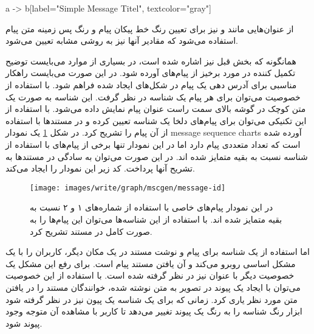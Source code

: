 \begin{MSC}
a -> b[label="Simple Message Titel", textcolor="gray"]
\end{MSC}

از عنوان‌هایی مانند  و  نیز برای تعیین رنگ خط
پیکان پیام و رنگ پس زمینه متن پیام استفاده می‌شود که مقادیر آنها نیز به روشی
مشابه تعیین می‌شود.


همانگونه که بخش قبل نیز اشاره شده است، در بسیاری از موارد می‌بایست توضیح تکمیل
کننده در مورد برخیز از پیام‌های آورده شود. در این صورت می‌بایست راهکار مناسبی
برای آدرس دهی یک پیام در شکل‌های ایجاد شده فراهم شود. با استفاده از خصوصیت
 می‌توان برای هر پیام یک شناسه در نظر گرفت. این شناسه به صورت یک متن کوچک
در گوشه بالای سمت راست عنوان پیام نمایش داده می‌شود. با استفاده از این تکنیکی
می‌توان برای پیام‌های دلخا یک شناسه تعیین کرده و در مستندها با استفاده از آن
پیام را تشریح کرد. در شکل \ref{write/graph/mscgen/message-id}
یک نمودار \glspl{message sequence chart} آورده شده است که تعداد متعددی پیام
دارد اما در این نمودار تنها برخی از پیام‌های با استفاده از شناسه نسبت به بقیه
متمایز شده اند. در این صورت می‌توان به سادگی در مستندها به تشریح آنها پرداخت. 
کد زیر این نمودار را ایجاد می‌کند.


\begin{figure}[h]
\centering
\texttt{[image: images/write/graph/mscgen/message-id]}
\caption[تعیین شناسه برای پیام‌ها]{
	در این نمودار پیام‌های خاصی با استفاده از شماره‌های ۱ و ۲ نسبت به بقیه متمایز
	شده اند. با استفاده از این شناسه‌ها می‌توان این پیام‌ها را به صورت کامل در
	مستند تشریح کرد.
	}
\label{write/graph/mscgen/message-id}
\end{figure}

اما استفاده از یک شناسه برای پیام و نوشت مستند در یک مکان دیگر، کاربران را با یک
مشکل اساسی روبرو می‌کند و آن یافتن مستند پیام است. برای رفع این مشکل یک خصوصیت
دیگر با عنوان  نیز در نظر گرفته شده است. با استفاده از این خصوصیت
می‌توان با ایجاد یک پیوند در تصویر به متن نوشته شده، خوانندگان مستند را در یافتن
متن مورد نظر یاری کرد. زمانی که برای یک شناسه یک پیون نیز در نظر گرفته شود ابزار
 رنگ شناسه را به رنگ یک پیوند تغییر می‌دهد تا کاربر با مشاهده آن
متوجه وجود پیوند شود.

